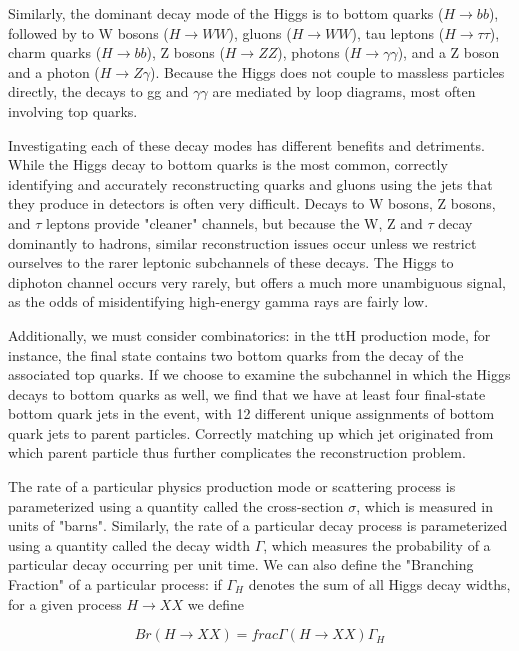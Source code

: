 Similarly, the dominant decay mode of the Higgs is to bottom quarks ($H \rightarrow bb$), followed by to W bosons ($H \rightarrow WW$), gluons ($H \rightarrow WW$), tau leptons ($H \rightarrow \tau \tau$), charm quarks ($H \rightarrow bb$), Z bosons ($H \rightarrow ZZ$), photons ($H \rightarrow \gamma \gamma$), and a Z boson and a photon ($H \rightarrow Z \gamma$). Because the Higgs does not couple to massless particles directly, the decays to gg and $\gamma \gamma$ are mediated by loop diagrams, most often involving top quarks.

Investigating each of these decay modes has different benefits and detriments. While the Higgs decay to bottom quarks is the most common, correctly identifying and accurately reconstructing quarks and gluons using the jets that they produce in detectors is often very difficult. Decays to W bosons, Z bosons, and $\tau$ leptons provide "cleaner" channels, but because the W, Z and $\tau$ decay dominantly to hadrons, similar reconstruction issues occur unless we restrict ourselves to the rarer leptonic subchannels of these decays. The Higgs to diphoton channel occurs very rarely, but offers a much more unambiguous signal, as the odds of misidentifying high-energy gamma rays are fairly low.

Additionally, we must consider combinatorics: in the ttH production mode, for instance, the final state contains two bottom quarks from the decay of the associated top quarks. If we choose to examine the subchannel in which the Higgs decays to bottom quarks as well, we find that we have at least four final-state bottom quark jets in the event, with 12 different unique assignments of bottom quark jets to parent particles. Correctly matching up which jet originated from which parent particle thus further complicates the reconstruction problem.

The rate of a particular physics production mode or scattering process is parameterized using a quantity called the cross-section $\sigma$, which is measured in units of "barns". Similarly, the rate of a particular decay process is parameterized using a quantity called the decay width $\Gamma$, which measures the probability of a particular decay occurring per unit time. We can also define the "Branching Fraction" of a particular process: if $\Gamma_{H}$ denotes the sum of all Higgs decay widths, for a given process $H \rightarrow XX$ we define

\begin{equation}
Br(H \rightarrow XX) = frac{\Gamma(H \rightarrow XX)}{\Gamma_{H}}
\end{equation}

